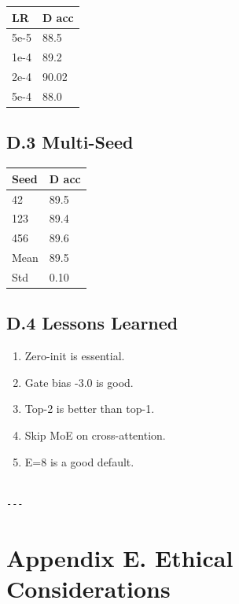 \begin{table}[H]
\centering
\small
\begin{tabular}{ll}
\toprule
\textbf{LR} & \textbf{D acc} \\
\midrule
5e-5 & 88.5 \\
1e-4 & 89.2 \\
2e-4 & 90.02 \\
5e-4 & 88.0 \\
\bottomrule
\end{tabular}
\end{table}

\subsection{D.3 Multi-Seed}

\begin{table}[H]
\centering
\small
\begin{tabular}{ll}
\toprule
\textbf{Seed} & \textbf{D acc} \\
\midrule
42 & 89.5 \\
123 & 89.4 \\
456 & 89.6 \\
Mean & 89.5 \\
Std & 0.10 \\
\bottomrule
\end{tabular}
\end{table}

\subsection{D.4 Lessons Learned}

\begin{enumerate}
\item Zero-init is essential.
\item Gate bias -3.0 is good.
\item Top-2 is better than top-1.
\item Skip MoE on cross-attention.
\item E=8 is a good default.
\end{enumerate}
\begin{lstlisting}

---
\end{lstlisting}

\section{Appendix E. Ethical Considerations}

